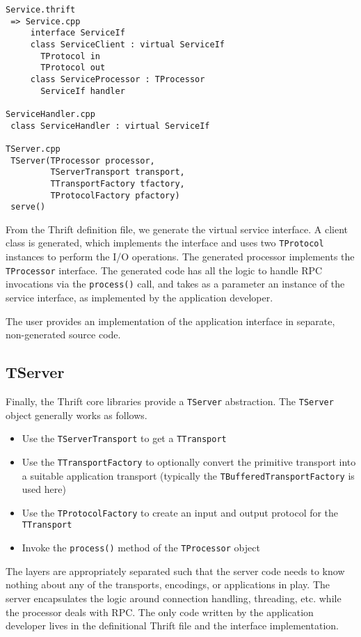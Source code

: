 \documentclass[nocopyrightspace,blockstyle]{sigplanconf}
\begin{document}
\begin{verbatim}
Service.thrift
 => Service.cpp
     interface ServiceIf
     class ServiceClient : virtual ServiceIf
       TProtocol in
       TProtocol out
     class ServiceProcessor : TProcessor
       ServiceIf handler

ServiceHandler.cpp
 class ServiceHandler : virtual ServiceIf

TServer.cpp
 TServer(TProcessor processor,
         TServerTransport transport,
         TTransportFactory tfactory,
         TProtocolFactory pfactory)
 serve()
\end{verbatim}

From the Thrift definition file, we generate the virtual service interface.
A client class is generated, which implements the interface and
uses two \texttt{TProtocol} instances to perform the I/O operations. The
generated processor implements the \texttt{TProcessor} interface. The generated
code has all the logic to handle RPC invocations via the \texttt{process()}
call, and takes as a parameter an instance of the service interface, as
implemented by the application developer.

The user provides an implementation of the application interface in separate,
non-generated source code.

\subsection{TServer}

Finally, the Thrift core libraries provide a \texttt{TServer} abstraction.
The \texttt{TServer} object generally works as follows.

\begin{itemize}
\item Use the \texttt{TServerTransport} to get a \texttt{TTransport}
\item Use the \texttt{TTransportFactory} to optionally convert the primitive
transport into a suitable application transport (typically the
\texttt{TBufferedTransportFactory} is used here)
\item Use the \texttt{TProtocolFactory} to create an input and output protocol
for the \texttt{TTransport}
\item Invoke the \texttt{process()} method of the \texttt{TProcessor} object
\end{itemize}

The layers are appropriately separated such that the server code needs to know
nothing about any of the transports, encodings, or applications in play. The
server encapsulates the logic around connection handling, threading, etc.
while the processor deals with RPC. The only code written by the application
developer lives in the definitional Thrift file and the interface
implementation.
\end{document}
